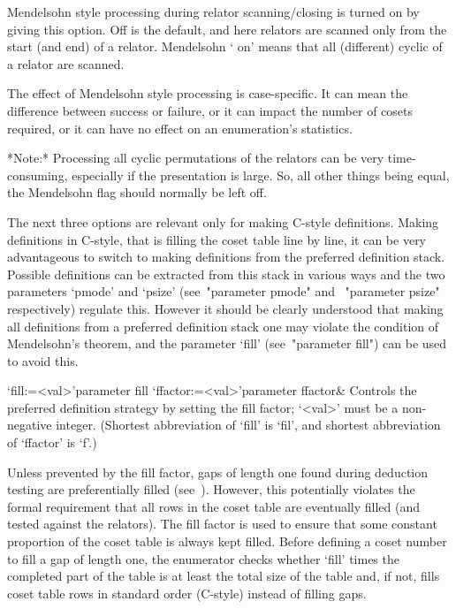 Mendelsohn style processing  during relator scanning/closing is turned
on by giving  this option.  Off is the default,  and here relators are
scanned only  from the start (and  end) of a  relator.  Mendelsohn \lq
on' means that all (different) cyclic of a relator are scanned.

The effect  of Mendelsohn style  processing is case-specific.   It can
mean the difference  between success or failure, or  it can impact the
number  of  cosets   required,  or  it  can  have   no  effect  on  an
enumeration's statistics.

*Note:* Processing all cyclic permutations of the relators can be very
time-consuming,  especially if  the  presentation is  large.  So,  all
other things being equal, the  Mendelsohn flag should normally be left
off.


The  next  three  options  are   relevant  only  for  making   C-style
definitions.  Making definitions in C-style, that is filling the coset
table line  by line, it can  be very advantageous to  switch to making
definitions from the preferred definition stack.  Possible definitions
can  be  extracted  from  this  stack  in various  ways  and  the  two
parameters `pmode'  and `psize' (see~"parameter  pmode" and ~"parameter
psize"  respectively)  regulate this.  However  it  should be  clearly
understood that  making  all definitions  from  a preferred  definition
stack one may  violate the condition of Mendelsohn's  theorem, and the
parameter `fill' (see~"parameter fill") can be used to avoid this.

\>`fill:=<val>'{parameter fill}
\>`ffactor:=<val>'{parameter ffactor}&
Controls the preferred definition strategy by setting the fill factor;
`<val>' must be a non-negative integer.
(Shortest abbreviation of `fill' is `fil', and shortest abbreviation of 
`ffactor' is `f'.)

Unless prevented by  the fill factor, gaps of  length one found during
deduction   testing  are  preferentially   filled  (see~\cite{Hav91}).
However,  this potentially  violates the  formal requirement  that all
rows in the coset table  are eventually filled (and tested against the
relators).   The fill  factor is  used  to ensure  that some  constant
proportion of the coset table  is always kept filled.  Before defining
a coset  number to  fill a  gap of length  one, the  enumerator checks
whether `fill' times  the completed part of the table  is at least the
total  size of  the  table and,  if  not, fills  coset  table rows  in
standard order (C-style) instead of filling gaps.


